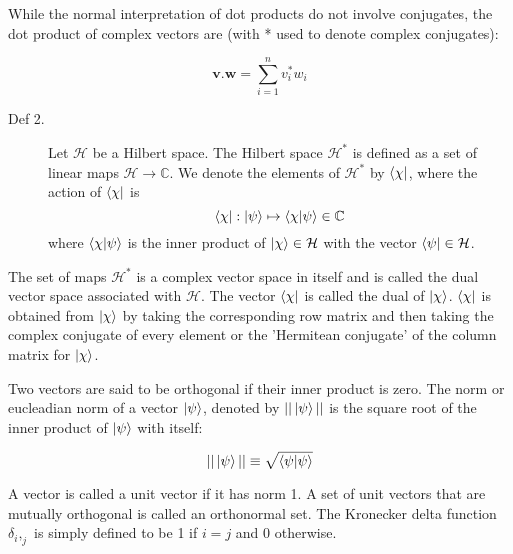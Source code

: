 \documentclass[12pt]{article}
\begin{document}
While the normal interpretation of dot products do not involve conjugates, the dot product of complex vectors are (with * used to denote complex conjugates):

\begin{equation}
    \mathbf{v} . \mathbf{w} =\sum_{i=1}^{n} v_i^* w_i
\end{equation}

\clearpage

\begin{description}
    \item[Def 2.] Let \(\mathcal{H}\) be a Hilbert space. The Hilbert space \(\mathcal{H}^*\) is defined as a set of linear maps \(\mathcal{H} \to \mathbb{C}\). We denote the elements of \(\mathcal{H}^*\) by \(\bra{\chi}\), where the action of \(\bra{\chi}\) is
    \begin{equation}
        \bra{\chi} : \ket{\psi} \mapsto \braket{\chi | \psi} \in \mathbb{C}
    \end{equation}
    where \(\braket{\chi | \psi}\) is the inner product of \(\ket{\chi} \in \mathcal{H}\) with the vector \(\bra{\psi} \in \mathcal{H}\).
\end{description}

The set of maps \(\mathcal{H}^*\) is a complex vector space in itself and is called the dual vector space associated with \(\mathcal{H}\). The vector \(\bra{\chi}\) is called the dual of \(\ket{\chi}\). \(\bra{\chi}\) is obtained from \(\ket{\chi}\) by taking the corresponding row matrix and then taking the complex conjugate of every element or the 'Hermitean conjugate' of the column matrix for \(\ket{\chi}\).

Two vectors are said to be orthogonal if their inner product is zero. The norm or eucleadian norm of a vector \(\ket{\psi}\), denoted by \(||\ket{\psi}||\) is the square root of the inner product of \(\ket{\psi}\) with itself:

\begin{equation}
    ||\ket{\psi}|| \equiv \sqrt{\braket{\psi|\psi}}
\end{equation}

A vector is called a unit vector if it has norm 1. A set of unit vectors that are mutually orthogonal is called an orthonormal set. The Kronecker delta function \(\delta_i,_j\) is simply defined to be 1 if \(i = j\) and 0 otherwise.
\end{document}
